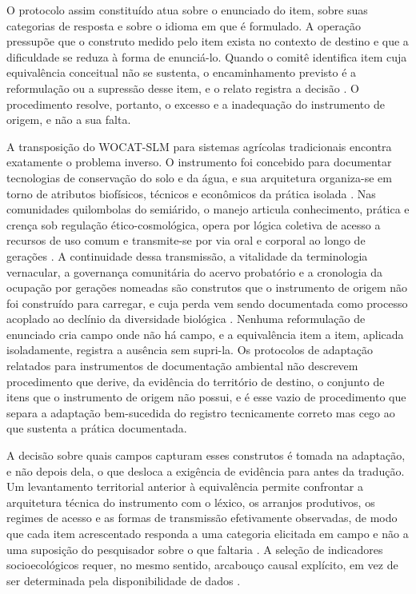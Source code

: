 \documentclass[preprint,authoryear,12pt]{elsarticle}
\begin{document}
O protocolo assim constituído atua sobre o enunciado do item, sobre suas categorias de resposta e sobre o idioma em que é formulado. A operação pressupõe que o construto medido pelo item exista no contexto de destino e que a dificuldade se reduza à forma de enunciá-lo. Quando o comitê identifica item cuja equivalência conceitual não se sustenta, o encaminhamento previsto é a reformulação ou a supressão desse item, e o relato registra a decisão \citep{Beaton2000,Herdman1999}. O procedimento resolve, portanto, o excesso e a inadequação do instrumento de origem, e não a sua falta.

A transposição do WOCAT-SLM para sistemas agrícolas tradicionais encontra exatamente o problema inverso. O instrumento foi concebido para documentar tecnologias de conservação do solo e da água, e sua arquitetura organiza-se em torno de atributos biofísicos, técnicos e econômicos da prática isolada \citep{Liniger2019,Schwilch2011}. Nas comunidades quilombolas do semiárido, o manejo articula conhecimento, prática e crença sob regulação ético-cosmológica, opera por lógica coletiva de acesso a recursos de uso comum e transmite-se por via oral e corporal ao longo de gerações \citep{Toledo2008,Ostrom1990,Berkes2017}. A continuidade dessa transmissão, a vitalidade da terminologia vernacular, a governança comunitária do acervo probatório e a cronologia da ocupação por gerações nomeadas são construtos que o instrumento de origem não foi construído para carregar, e cuja perda vem sendo documentada como processo acoplado ao declínio da diversidade biológica \citep{Maffi2001,ReyesGarcia2013evidence,Zent2014}. Nenhuma reformulação de enunciado cria campo onde não há campo, e a equivalência item a item, aplicada isoladamente, registra a ausência sem supri-la. Os protocolos de adaptação relatados para instrumentos de documentação ambiental não descrevem procedimento que derive, da evidência do território de destino, o conjunto de itens que o instrumento de origem não possui, e é esse vazio de procedimento que separa a adaptação bem-sucedida do registro tecnicamente correto mas cego ao que sustenta a prática documentada.

A decisão sobre quais campos capturam esses construtos é tomada na adaptação, e não depois dela, o que desloca a exigência de evidência para antes da tradução. Um levantamento territorial anterior à equivalência permite confrontar a arquitetura técnica do instrumento com o léxico, os arranjos produtivos, os regimes de acesso e as formas de transmissão efetivamente observadas, de modo que cada item acrescentado responda a uma categoria elicitada em campo e não a uma suposição do pesquisador sobre o que faltaria \citep{Rist2006,Gioia2013}. A seleção de indicadores socioecológicos requer, no mesmo sentido, arcabouço causal explícito, em vez de ser determinada pela disponibilidade de dados \citep{Niemeijer2008,Dale2001}.
\end{document}
